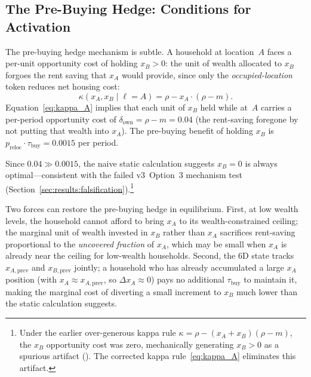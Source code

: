 \subsection{The Pre-Buying Hedge: Conditions for Activation}
\label{sec:discussion:hedge}

The pre-buying hedge mechanism is subtle.
A household at location~$A$ faces a per-unit opportunity cost of holding
$x_B > 0$: the unit of wealth allocated to $x_B$ forgoes the rent saving
that $x_A$ would provide, since only the \emph{occupied-location} token
reduces net housing cost:
\begin{equation}
    \kappa(x_A, x_B \mid \ell{=}A)
    = \rho - x_A \cdot (\rho - m).
    \label{eq:kappa_A}
\end{equation}
Equation~\eqref{eq:kappa_A} implies that each unit of $x_B$ held while
at~$A$ carries a per-period opportunity cost of $\delta_{\text{own}} = \rho - m
= 0.04$ (the rent-saving foregone by not putting that wealth into $x_A$).
The pre-buying benefit of holding $x_B$ is $p_{\text{reloc}} \cdot
\tau_{\text{buy}} = 0.0015$ per period.

Since $0.04 \gg 0.0015$, the naive static calculation suggests $x_B = 0$
is always optimal---consistent with the failed v3~Option~3 mechanism
test (Section~\ref{sec:results:falsification}).\footnote{Under the earlier
over-generous kappa rule $\kappa = \rho - (x_A + x_B)(\rho - m)$, the
$x_B$ opportunity cost was zero, mechanically generating $x_B > 0$
as a spurious artifact (\citealt{research_log_2026_05_01_fix}).
The corrected kappa rule~\eqref{eq:kappa_A} eliminates this artifact.}

Two forces can restore the pre-buying hedge in equilibrium.
First, at low wealth levels, the household cannot afford to bring $x_A$ to
its wealth-constrained ceiling; the marginal unit of wealth invested in $x_B$
rather than $x_A$ sacrifices rent-saving proportional to the \emph{uncovered
fraction} of $x_A$, which may be small when $x_A$ is already near the ceiling
for low-wealth households.
Second, the 6D state tracks $x_{A,\text{prev}}$ and $x_{B,\text{prev}}$
jointly; a household who has already accumulated a large $x_A$ position
(with $x_A \approx x_{A,\text{prev}}$, so $\Delta x_A \approx 0$) pays no
additional $\tau_{\text{buy}}$ to maintain it, making the marginal cost of
diverting a small increment to $x_B$ much lower than the static calculation
suggests.

